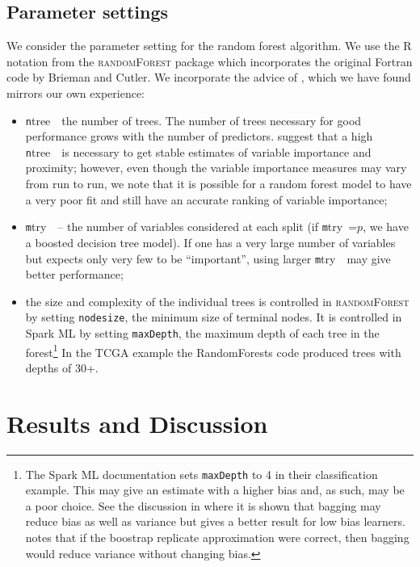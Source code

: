 \documentclass[10pt,letterpaper]{article}
\newcommand{\mtry}{{\texttt mtry\ }}
\newcommand{\ntree}{{\texttt ntree\ }}
\begin{document}
\subsection{Parameter settings}
We consider the parameter setting for the random forest algorithm. We use the R notation from the \textsc{randomForest}
package \cite{Liaw.and.Weiner.2002} which incorporates the original Fortran code by Brieman and Cutler.  We incorporate
the advice of \cite{Liaw.and.Weiner.2002}, which we have found mirrors our own experience:
\begin{itemize}
\item \ntree\ the number of trees.  The number of trees necessary for good performance grows with the number of
  predictors.  \cite{Liaw.and.Weiner.2002} suggest that a high \ntree\ is necessary to get stable estimates of variable
  importance and proximity; however, even though the variable importance measures may vary from run to run, we note that
  it is possible for a random forest model to have a very poor fit and still have an accurate ranking of variable
  importance;
\item \mtry\ -- the number of variables considered at each split (if \mtry=$p$, we have a boosted decision
  tree model).  If one has a very large number of variables but expects only very few to be ``important'', using larger \mtry\ may give
  better performance;
\item the size and complexity of the individual trees is controlled in
  \textsc{randomForest} by setting \texttt{nodesize}, the minimum size of
  terminal nodes. It is controlled in Spark ML by setting
  \texttt{maxDepth}, the maximum depth of each tree in the
  forest\footnote{The Spark ML documentation \cite[]{Spark.2016} sets
    \texttt{maxDepth} to 4 in their classification example. This may
    give an estimate with a higher bias and, as such, may be a poor
    choice. See the discussion in \cite{Dietterich.2002} where it is
    shown that bagging may reduce bias as well as variance but gives a
    better result for low bias learners. \cite{Dietterich.2002} notes
    that if the boostrap replicate approximation were correct, then
    bagging would reduce variance without changing bias.} In the TCGA
  example the RandomForests code produced trees with depths of 30+.
\end{itemize}



%
%
\section{Results and Discussion}
\end{document}
